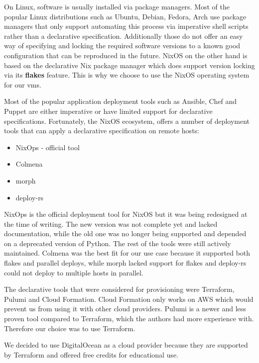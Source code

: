 On Linux, software is usually installed via package managers. Most of
the popular Linux distributions such as Ubuntu, Debian, Fedora, Arch use
package managers that only support automating this process via
imperative shell scripts rather than a declarative specification.
Additionally those do not offer an easy way of specifying and locking
the required software versions to a known good configuration that can be
reproduced in the future. NixOS on the other hand is based on the
declarative Nix package manager which does support version locking via
its \textbf{flakes} feature. This is why we choose to use the NixOS
operating system for our \glspl{vm}.

Most of the popular application deployment tools such as Ansible, Chef
and Puppet are either imperative or have limited support for declarative
specifications. Fortunately, the NixOS ecosystem, offers a number of
deployment tools that can apply a declarative specification on remote
hosts:

\begin{itemize}
\tightlist
\item
  NixOps\autocite{nixopsSource,nixopsDocs} - official tool
\item
  Colmena \autocite{colmenaSource,colmenaDocs}
\item
  morph \autocite{morphSource}
\item
  deploy-rs \autocite{deployrsSource}
\end{itemize}

NixOps is the official deployment tool for NixOS but it was being
redesigned at the time of writing. The new version was not complete yet
and lacked documentation, while the old one was no longer being
supported and depended on a deprecated version of Python. The rest of
the tools were still actively maintained. Colmena was the best fit for
our use case because it supported both flakes and parallel deploys,
while morph lacked support for flakes and deploy-rs could not deploy to
multiple hosts in parallel.

The declarative tools that were considered for provisioning were
Terraform, Pulumi and Cloud Formation. Cloud Formation only works on AWS
which would prevent us from using it with other cloud providers. Pulumi
is a newer and less proven tool compared to Terraform, which the authors
had more experience with. Therefore our choice was to use Terraform.

We decided to use DigitalOcean as a cloud provider because they are
supported by Terraform and offered free credits for educational use.

